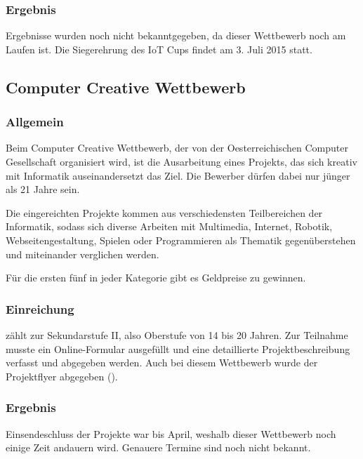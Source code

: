 \subsubsection{Ergebnis}
Ergebnisse wurden noch nicht bekanntgegeben, da dieser Wettbewerb noch am Laufen ist.
Die Siegerehrung des IoT Cups findet am 3. Juli 2015 statt.

\subsection{Computer Creative Wettbewerb}
\subsubsection{Allgemein}
Beim Computer Creative Wettbewerb, der von der Oesterreichischen Computer Gesellschaft
organisiert wird, ist die Ausarbeitung eines Projekts, das sich kreativ mit Informatik
auseinandersetzt das Ziel. Die Bewerber dürfen dabei nur jünger als 21 Jahre sein.

Die eingereichten Projekte kommen aus verschiedensten Teilbereichen der Informatik,
sodass sich diverse Arbeiten mit Multimedia, Internet, Robotik, Webseitengestaltung, Spielen oder
Programmieren als Thematik gegenüberstehen und miteinander verglichen werden.

Für die ersten fünf in jeder Kategorie gibt es Geldpreise zu gewinnen.

\subsubsection{Einreichung}
\sblit zählt zur Sekundarstufe II, also Oberstufe von 14 bis 20 Jahren. Zur Teilnahme
musste ein Online-Formular ausgefüllt und eine detaillierte Projektbeschreibung
verfasst und abgegeben werden. Auch bei diesem Wettbewerb wurde der Projektflyer
abgegeben ().

\subsubsection{Ergebnis}
Einsendeschluss der Projekte war bis April, weshalb dieser Wettbewerb noch einige Zeit
andauern wird. Genauere Termine sind noch nicht bekannt.

